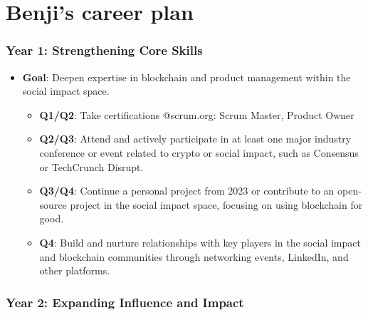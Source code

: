 
\section*{Benji's career plan}


\hypertarget{year-1-strengthening-core-skills-and-network}{%
\subsubsection*{\texorpdfstring{\textbf{Year 1: Strengthening Core Skills}}{Year 1: Strengthening Core Skills and Network}}\label{year-1-strengthening-core-skills-and-network}}

\begin{itemize}
\tightlist
\item
  \textbf{Goal}: Deepen expertise in blockchain and product management
  within the social impact space.

  \begin{itemize}
  \tightlist
  \item
    \textbf{Q1/Q2}: Take certifications @scrum.org:
    Scrum Master,
    Product Owner
  \item
    \textbf{Q2/Q3}: Attend and actively participate in at least one major
    industry conference or event related to crypto or social impact,
    such as Consensus or TechCrunch Disrupt.
  \item
    \textbf{Q3/Q4}: Continue a personal project from 2023 or contribute to an
    open-source project in the social impact space, focusing on using
    blockchain for good.
  \item
    \textbf{Q4}: Build and nurture relationships with key players in the
    social impact and blockchain communities through networking events,
    LinkedIn, and other platforms.
  \end{itemize}
\end{itemize}

\hypertarget{year-2-expanding-influence-and-impact}{%
\subsubsection*{\texorpdfstring{\textbf{Year 2: Expanding Influence and
Impact}}{Year 2: Expanding Influence and Impact}}\label{year-2-expanding-influence-and-impact}}

